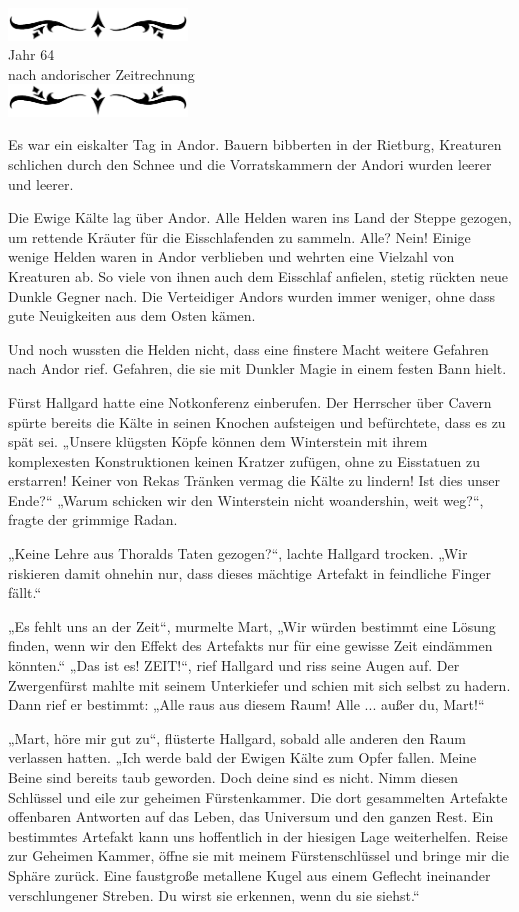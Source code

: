 \documentclass[10pt, a4paper, oneside]{book}
\newcommand{\az}[1]{%
    \begin{center}
        \includegraphics[width=180px]{Das Erbe des Wunderkindes/verzierung1.png}\\
        {\Huge #1} \\
        {nach andorischer Zeitrechnung}\\
        \includegraphics[width=180px]{Das Erbe des Wunderkindes/verzierung2.png}
    \end{center}
    \extramarks{}{#1 a.Z.}
}
\begin{document}
\az{Jahr 64}

Es war ein eiskalter Tag in Andor. Bauern bibberten in der Rietburg, Kreaturen schlichen durch den Schnee und die Vorratskammern der Andori wurden leerer und leerer. \bigskip

Die Ewige Kälte lag über Andor. Alle Helden waren ins Land der Steppe gezogen, um rettende Kräuter für die Eisschlafenden zu sammeln. Alle? Nein! Einige wenige Helden waren in Andor verblieben und wehrten eine Vielzahl von Kreaturen ab. So viele von ihnen auch dem Eisschlaf anfielen, stetig rückten neue Dunkle Gegner nach. Die Verteidiger Andors wurden immer weniger, ohne dass gute Neuigkeiten aus dem Osten kämen. 

Und noch wussten die Helden nicht, dass eine finstere Macht weitere Gefahren nach Andor rief. Gefahren, die sie mit Dunkler Magie in einem festen Bann hielt. \bigskip

Fürst Hallgard hatte eine Notkonferenz einberufen. Der Herrscher über Cavern spürte bereits die Kälte in seinen Knochen aufsteigen und befürchtete, dass es zu spät sei. „Unsere klügsten Köpfe können dem Winterstein mit ihrem komplexesten Konstruktionen keinen Kratzer zufügen, ohne zu Eisstatuen zu erstarren! Keiner von Rekas Tränken vermag die Kälte zu lindern! Ist dies unser Ende?“ „Warum schicken wir den Winterstein nicht woandershin, weit weg?“, fragte der grimmige Radan. 

„Keine Lehre aus Thoralds Taten gezogen?“, lachte Hallgard trocken. „Wir riskieren damit ohnehin nur, dass dieses mächtige Artefakt in feindliche Finger fällt.“

„Es fehlt uns an der Zeit“, murmelte Mart, „Wir würden bestimmt eine Lösung finden, wenn wir den Effekt des Artefakts nur für eine gewisse Zeit eindämmen könnten.“ „Das ist es! ZEIT!“, rief Hallgard und riss seine Augen auf. Der Zwergenfürst mahlte mit seinem Unterkiefer und schien mit sich selbst zu hadern. Dann rief er bestimmt: „Alle raus aus diesem Raum! Alle ... außer du, Mart!“ \bigskip

„Mart, höre mir gut zu“, flüsterte Hallgard, sobald alle anderen den Raum verlassen hatten. „Ich werde bald der Ewigen Kälte zum Opfer fallen. Meine Beine sind bereits taub geworden. Doch deine sind es nicht. Nimm diesen Schlüssel und eile zur geheimen Fürstenkammer. Die dort gesammelten Artefakte offenbaren Antworten auf das Leben, das Universum und den ganzen Rest. Ein bestimmtes Artefakt kann uns hoffentlich in der hiesigen Lage weiterhelfen. Reise zur Geheimen Kammer, öffne sie mit meinem Fürstenschlüssel und bringe mir die Sphäre zurück. Eine faustgroße metallene Kugel aus einem Geflecht ineinander verschlungener Streben. Du wirst sie erkennen, wenn du sie siehst.“ 
\end{document}
